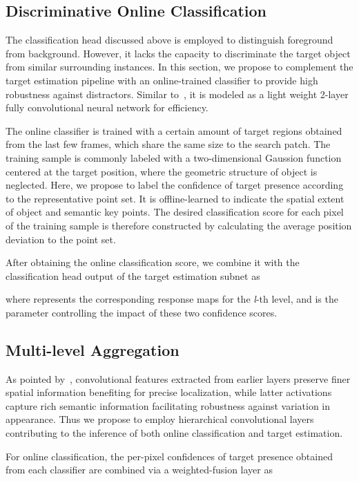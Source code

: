 \documentclass[runningheads]{llncs}
\begin{document}
\subsection{Discriminative Online Classification}
The classification head discussed above is employed to distinguish foreground from background. However, it lacks the capacity to
discriminate the target object from similar surrounding instances. In this section, we propose to complement the target estimation pipeline
 with an online-trained classifier to provide high robustness against
distractors. Similar to~\cite{atom,drol}, it is modeled as a light weight
2-layer fully convolutional neural network for efficiency.

The online classifier is trained with a certain amount of target regions
obtained from the last few frames, which share the same size to the
search patch. The training sample is commonly labeled with
a two-dimensional Gaussion function centered at the target position, where
the geometric structure of object is neglected. Here, we propose to
label the confidence of target presence according to the representative
point set. It is offline-learned to indicate the spatial extent of
object and semantic key points. The desired classification score for
each pixel of the training sample is therefore constructed by
calculating the average position deviation to the point set.

After obtaining the online classification score, we combine it with the
classification head output of the target estimation subnet as


where represents the corresponding response maps for the
\emph{l}-th level, and  is the parameter controlling the
impact of these two confidence scores.
\subsection{Multi-level Aggregation}
As pointed by~\cite{HCFST,HCFT}, convolutional features extracted from earlier
layers preserve finer spatial information benefiting for precise
localization, while latter activations capture rich semantic information
facilitating robustness against variation in appearance. Thus
we propose to employ hierarchical convolutional layers contributing to the inference of both online classification and target estimation.

For online classification, the per-pixel confidences of target
presence obtained from each classifier are combined via a
weighted-fusion layer as
\end{document}

